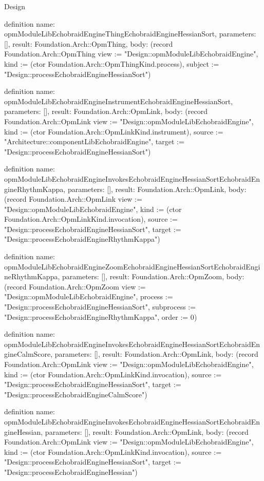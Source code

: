 \begin{lexlean}{Design}
\begin{semanticmodule}
definition{
  name: opmModuleLibEchobraidEngineThingEchobraidEngineHessianSort,
  parameters: [],
  result: Foundation.Arch::OpmThing,
  body: (record Foundation.Arch::OpmThing {view := "Design::opmModuleLibEchobraidEngine", kind := (ctor Foundation.Arch::OpmThingKind.process), subject := "Design::processEchobraidEngineHessianSort"})
}

definition{
  name: opmModuleLibEchobraidEngineInstrumentEchobraidEngineHessianSort,
  parameters: [],
  result: Foundation.Arch::OpmLink,
  body: (record Foundation.Arch::OpmLink {view := "Design::opmModuleLibEchobraidEngine", kind := (ctor Foundation.Arch::OpmLinkKind.instrument), source := "Architecture::componentLibEchobraidEngine", target := "Design::processEchobraidEngineHessianSort"})
}

definition{
  name: opmModuleLibEchobraidEngineInvokesEchobraidEngineHessianSortEchobraidEngineRhythmKappa,
  parameters: [],
  result: Foundation.Arch::OpmLink,
  body: (record Foundation.Arch::OpmLink {view := "Design::opmModuleLibEchobraidEngine", kind := (ctor Foundation.Arch::OpmLinkKind.invocation), source := "Design::processEchobraidEngineHessianSort", target := "Design::processEchobraidEngineRhythmKappa"})
}

definition{
  name: opmModuleLibEchobraidEngineZoomEchobraidEngineHessianSortEchobraidEngineRhythmKappa,
  parameters: [],
  result: Foundation.Arch::OpmZoom,
  body: (record Foundation.Arch::OpmZoom {view := "Design::opmModuleLibEchobraidEngine", process := "Design::processEchobraidEngineHessianSort", subprocess := "Design::processEchobraidEngineRhythmKappa", order := 0})
}

definition{
  name: opmModuleLibEchobraidEngineInvokesEchobraidEngineHessianSortEchobraidEngineCalmScore,
  parameters: [],
  result: Foundation.Arch::OpmLink,
  body: (record Foundation.Arch::OpmLink {view := "Design::opmModuleLibEchobraidEngine", kind := (ctor Foundation.Arch::OpmLinkKind.invocation), source := "Design::processEchobraidEngineHessianSort", target := "Design::processEchobraidEngineCalmScore"})
}

definition{
  name: opmModuleLibEchobraidEngineInvokesEchobraidEngineHessianSortEchobraidEngineHessian,
  parameters: [],
  result: Foundation.Arch::OpmLink,
  body: (record Foundation.Arch::OpmLink {view := "Design::opmModuleLibEchobraidEngine", kind := (ctor Foundation.Arch::OpmLinkKind.invocation), source := "Design::processEchobraidEngineHessianSort", target := "Design::processEchobraidEngineHessian"})
}


\end{semanticmodule}
\end{lexlean}
